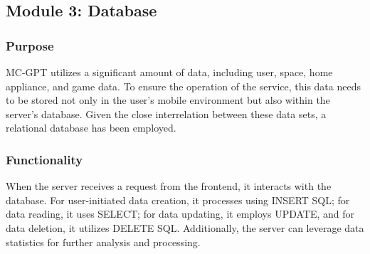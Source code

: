 \documentclass[conference]{IEEEtran}
\begin{document}
    \subsection{Module 3: Database}
        \subsubsection{Purpose}
            MC-GPT utilizes a significant amount of data, including user, space, home appliance, and game data. To ensure the operation of the service, this data needs to be stored not only in the user's mobile environment but also within the server's database. Given the close interrelation between these data sets, a relational database has been employed.\\
        \subsubsection{Functionality}
            When the server receives a request from the frontend, it interacts with the database. For user-initiated data creation, it processes using INSERT SQL; for data reading, it uses SELECT; for data updating, it employs UPDATE, and for data deletion, it utilizes DELETE SQL. Additionally, the server can leverage data statistics for further analysis and processing.\\
\end{document}
